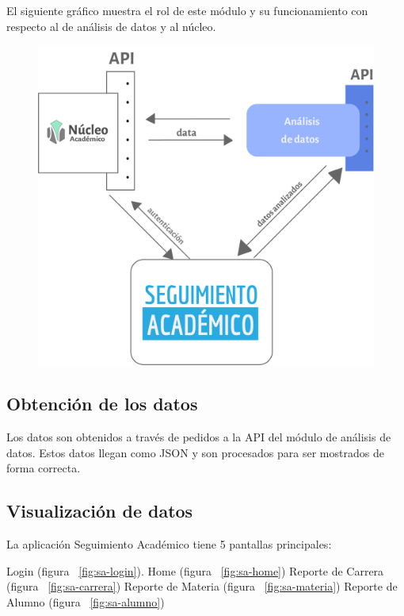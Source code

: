 El siguiente gráfico muestra el rol de este módulo y su funcionamiento con respecto al de análisis de datos y al núcleo.

\begin{figure}[h!]
  \centering
    \includegraphics[scale=0.8]{images/seguimiento-academico/flow-seguimiento-academico.png}
  \label{fig:analisis-datos}
\end{figure}

\subsection{Obtención de los datos}

Los datos son obtenidos a través de pedidos a la API del módulo de análisis de datos. Estos datos llegan como JSON y son procesados para ser mostrados de forma correcta.


\subsection{Visualización de datos}

La aplicación Seguimiento Académico tiene 5 pantallas principales:
\begin{outline}
 \1 Login (figura ~\ref{fig:sa-login}).
 \1 Home (figura ~\ref{fig:sa-home})
 \1 Reporte de Carrera (figura ~\ref{fig:sa-carrera})
 \1 Reporte de Materia (figura ~\ref{fig:sa-materia})
 \1 Reporte de Alumno (figura ~\ref{fig:sa-alumno})
\end{outline}


